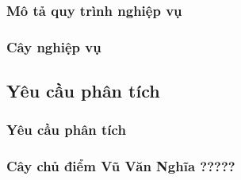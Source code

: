 \documentclass{beamer}
\begin{document}
\subsubsection{Mô tả quy trình nghiệp vụ}
\subsubsection{Cây nghiệp vụ}
\subsection{Yêu cầu phân tích}
\subsubsection{Yêu cầu phân tích}
\subsubsection{Cây chủ điểm Vũ Văn Nghĩa ?????}
\end{document}
